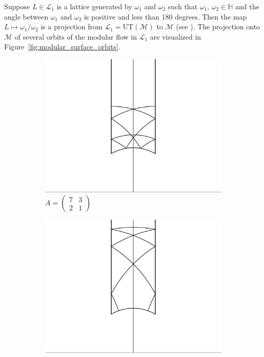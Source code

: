 \documentclass[12pt,twoside]{reedthesis}
\theoremstyle{definition}
\renewcommand{\H}{\mathbb{H}}
\newcommand{\LS}{\mathcal{L}}
\newcommand{\UT}{\mathrm{UT}}
\begin{document}
Suppose $L \in \LS_1$ is a lattice generated by $\omega_1$ and $\omega_2$ such that $\omega_1,\, \omega_2 \in \H$ and the angle between $\omega_1$ and $\omega_2$ is positive and less than 180 degrees.
Then the map $L \mapsto \omega_1 / \omega_2$ is a projection from $\LS_1 = \UT(\mathcal{M})$ to $\mathcal{M}$ (see \cite[6-13]{silverman1994}).
The projection onto $\mathcal{M}$ of several orbits of the modular flow in $\LS_1$ are visualized in Figure~\ref{fig:modular_surface_orbits}.

\begin{figure}[t]
  \centering
  \begin{subfigure}[t]{0.4\textwidth}
    \centering
    \includegraphics[width=\textwidth]{figures/modular_surface_orbit_pppqq.pdf}
    \caption*{$A = \begin{pmatrix}7 & 3 \\ 2 & 1\end{pmatrix}$}
  \end{subfigure}
  \hspace{3mm}
  \begin{subfigure}[t]{0.4\textwidth}
    \centering
    \includegraphics[width=\textwidth]{figures/modular_surface_orbit_ppppq.pdf}

\end{subfigure}
\end{figure}
\end{document}
